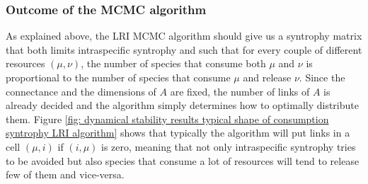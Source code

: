 \documentclass[12pt, titlepage]{report}
\begin{document}
\subsubsection{Outcome of the MCMC algorithm}
As explained above, the LRI MCMC algorithm should give us a syntrophy matrix that both limits intraspecific syntrophy and such that for every couple of different resources $(\mu, \nu)$, the number of species that consume both $\mu$ and $\nu$ is proportional to the number of species that consume $\mu$ and release $\nu$.
Since the connectance and the dimensions of $A$ are fixed, the number of links of $A$ is already decided and the algorithm simply determines how to optimally distribute them.
Figure \ref{fig: dynamical stability results typical shape of consumption syntrophy LRI algorithm} shows that typically the algorithm will put links in a cell $(\mu,i)$ if $(i, \mu)$ is zero, meaning that not only intraspecific syntrophy tries to be avoided but also species that consume a lot of resources will tend to release few of them and vice-versa.
\end{document}

